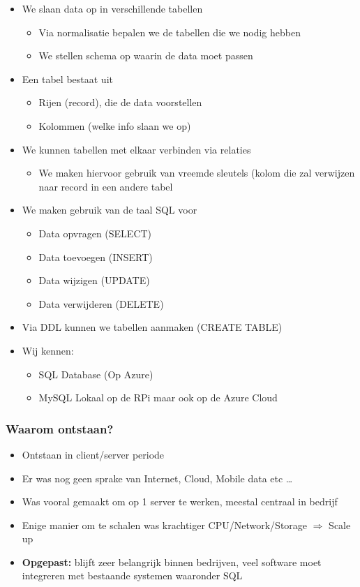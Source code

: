 \documentclass{article}
\newcommand{\bold}[1]{\textbf{#1}}
\begin{document}
\begin{itemize}
    \item We slaan data op in verschillende tabellen
    \begin{itemize}
        \item Via normalisatie bepalen we de tabellen die we nodig hebben
        \item We stellen schema op waarin de data moet passen
    \end{itemize}
    \item Een tabel bestaat uit
    \begin{itemize}
        \item Rijen (record), die de data voorstellen
        \item Kolommen (welke info slaan we op)
    \end{itemize}
    \item We kunnen tabellen met elkaar verbinden via relaties
    \begin{itemize}
        \item We maken hiervoor gebruik van vreemde sleutels (kolom die zal verwijzen naar record in een andere tabel
    \end{itemize}
    \item We maken gebruik van de taal SQL voor
    \begin{itemize}
        \item Data opvragen (SELECT)
        \item Data toevoegen (INSERT)
        \item Data wijzigen (UPDATE)
        \item Data verwijderen (DELETE)
    \end{itemize}
    \item Via DDL kunnen we tabellen aanmaken (CREATE TABLE)
    \item Wij kennen:
    \begin{itemize}
        \item SQL Database (Op Azure)
        \item MySQL Lokaal op de RPi maar ook op de Azure Cloud
    \end{itemize}
\end{itemize}

\subsubsection{Waarom ontstaan?}

\begin{itemize}
    \item Ontstaan in client/server periode
    \item Er was nog geen sprake van Internet, Cloud, Mobile data etc \dots
    \item Was vooral gemaakt om op 1 server te werken, meestal centraal in bedrijf
    \item Enige manier om te schalen was krachtiger CPU/Network/Storage $\Rightarrow$ Scale up
    \item \bold{Opgepast:} blijft zeer belangrijk binnen bedrijven, veel software moet integreren met bestaande systemen waaronder SQL
\end{itemize}
\end{document}

